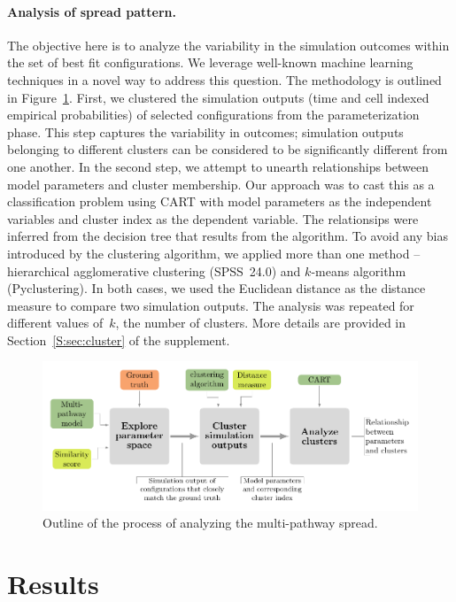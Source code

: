 \documentclass[11pt]{article}
\theoremstyle{definition}
\begin{document}
\paragraph{Analysis of spread pattern.} The objective here is to analyze
the variability in the simulation outcomes within the set of best fit
configurations. We leverage well-known machine learning techniques in a
novel way to address this question. The methodology is 
outlined in Figure~\ref{fig:clusterOutline}. First, we clustered
the simulation outputs (time and cell indexed empirical probabilities) of
selected configurations from the parameterization phase. This step captures
the variability in outcomes; simulation outputs belonging to different
clusters can be considered to be significantly different from one another.
In the second step, we attempt to unearth relationships between model
parameters and cluster membership. Our approach was to cast this as a
classification problem using CART with model parameters as the independent
variables and cluster index as the dependent variable. The relationsips
were inferred from the decision tree that results from the algorithm.
To avoid any bias introduced by the clustering algorithm, we applied more
than one method -- hierarchical agglomerative clustering (SPSS~24.0) and
$k$-means algorithm (Pyclustering). In both cases, we used the Euclidean
distance as the distance measure to compare two simulation outputs. The
analysis was repeated for different values of~$k$, the number of clusters.
More details are provided in Section~\ref{S:sec:cluster} of the supplement.
\begin{figure}[htb]
    \centering
    \includegraphics[width=.8\textwidth]{figs/spread_analysis.pdf}
    \caption{Outline of the process of analyzing the multi-pathway spread. \label{fig:clusterOutline}}
\end{figure}
\section{Results}
\end{document}
